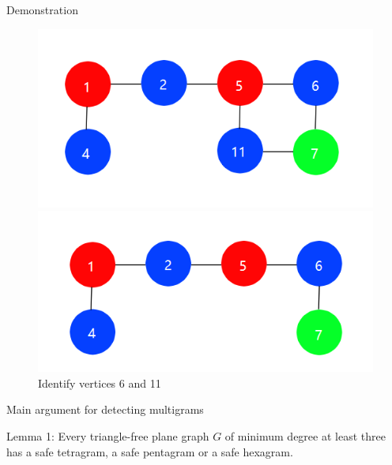 \documentclass{beamer}
\begin{document}
\begin{frame}{Demonstration}
\begin{figure}[htbp]
\centering
\begin{minipage}[t]{0.5\textwidth}
\centering
\includegraphics[width=1\textwidth]{figure/5.png}
\caption{Identify vertices 1 and 3}
\end{minipage}
\begin{minipage}[t]{0.48\textwidth}
\centering
\includegraphics[width=1\textwidth]{figure/6.png}
\caption{Identify vertices 6 and 11}
\end{minipage}
\end{figure}
\end{frame}


\begin{frame}{Main argument for detecting multigrams}
    \begin{block}{Lemma 1:}
    Every triangle-free plane graph $G$ of minimum degree at least three has a safe tetragram, a safe pentagram or a safe hexagram.
    \end{block}
\end{frame}
\end{document}
